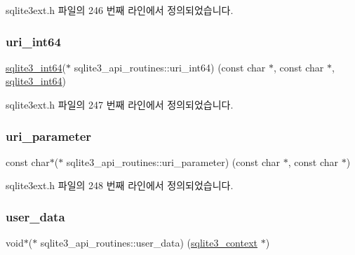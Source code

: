 sqlite3ext.\+h 파일의 246 번째 라인에서 정의되었습니다.

\mbox{\label{structsqlite3__api__routines_a70dfce68b81e6c77b3e6c3d8e874c070}} 
\subsubsection{\texorpdfstring{uri\+\_\+int64}{uri\_int64}}
{\footnotesize\ttfamily \hyperlink{sqlite3_8h_a0a4d3e6c1ad46f90e746b920ab6ca0d2}{sqlite3\+\_\+int64}($\ast$ sqlite3\+\_\+api\+\_\+routines\+::uri\+\_\+int64) (const char $\ast$, const char $\ast$, \hyperlink{sqlite3_8h_a0a4d3e6c1ad46f90e746b920ab6ca0d2}{sqlite3\+\_\+int64})}



sqlite3ext.\+h 파일의 247 번째 라인에서 정의되었습니다.

\mbox{\label{structsqlite3__api__routines_add5f520297676876e836eec5c976c6ba}} 
\subsubsection{\texorpdfstring{uri\+\_\+parameter}{uri\_parameter}}
{\footnotesize\ttfamily const char$\ast$($\ast$ sqlite3\+\_\+api\+\_\+routines\+::uri\+\_\+parameter) (const char $\ast$, const char $\ast$)}



sqlite3ext.\+h 파일의 248 번째 라인에서 정의되었습니다.

\mbox{\label{structsqlite3__api__routines_a4e066cc9b45c788202731ab113711833}} 
\subsubsection{\texorpdfstring{user\+\_\+data}{user\_data}}
{\footnotesize\ttfamily void$\ast$($\ast$ sqlite3\+\_\+api\+\_\+routines\+::user\+\_\+data) (\hyperlink{sqlite3_8h_a3b519553ffec8fc42b2356f5b1ebdc57}{sqlite3\+\_\+context} $\ast$)}



